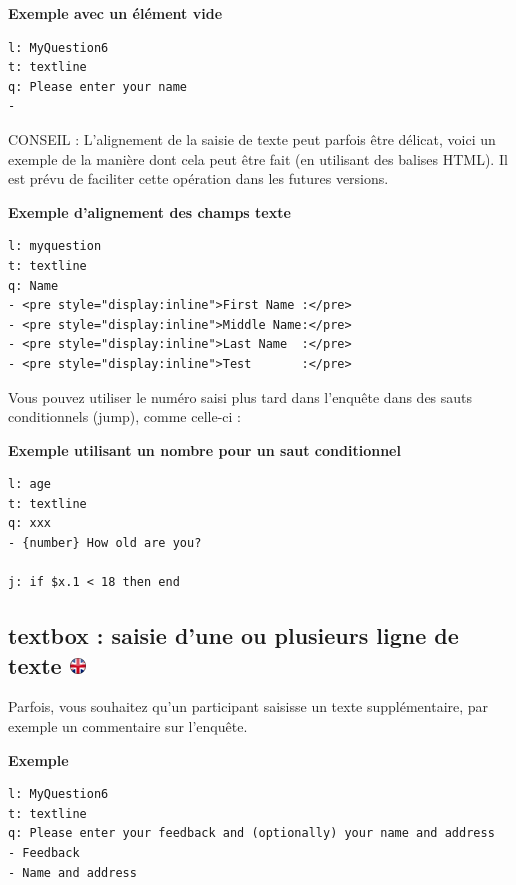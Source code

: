 \documentclass[
]{book}
\begin{document}
\textbf{Exemple avec un élément vide}

\begin{verbatim}
l: MyQuestion6
t: textline
q: Please enter your name
-
\end{verbatim}

CONSEIL : L'alignement de la saisie de texte peut parfois être délicat, voici un exemple de la manière dont cela peut être fait (en utilisant des balises HTML). Il est prévu de faciliter cette opération dans les futures versions.

\textbf{Exemple d'alignement des champs texte}

\begin{verbatim}
l: myquestion
t: textline
q: Name
- <pre style="display:inline">First Name :</pre>
- <pre style="display:inline">Middle Name:</pre>
- <pre style="display:inline">Last Name  :</pre>
- <pre style="display:inline">Test       :</pre>
\end{verbatim}

Vous pouvez utiliser le numéro saisi plus tard dans l'enquête dans des sauts conditionnels (jump), comme celle-ci :

\textbf{Exemple utilisant un nombre pour un saut conditionnel}

\begin{verbatim}
l: age
t: textline
q: xxx
- {number} How old are you?

j: if $x.1 < 18 then end
\end{verbatim}

\hypertarget{textbox-saisie-dune-ou-plusieurs-ligne-de-texte}{%
\subsection[textbox : saisie d'une ou plusieurs ligne de texte ]{\texorpdfstring{textbox : saisie d'une ou plusieurs ligne de texte \href{https://www.psytoolkit.org/doc3.2.0/online-survey-syntax.html\#textbox}{\protect\includegraphics{img/ukflag.png}}}{textbox : saisie d'une ou plusieurs ligne de texte }}\label{textbox-saisie-dune-ou-plusieurs-ligne-de-texte}}

Parfois, vous souhaitez qu'un participant saisisse un texte supplémentaire, par exemple un commentaire sur l'enquête.

\textbf{Exemple}

\begin{verbatim}
l: MyQuestion6
t: textline
q: Please enter your feedback and (optionally) your name and address
- Feedback
- Name and address
\end{verbatim}
\end{document}
